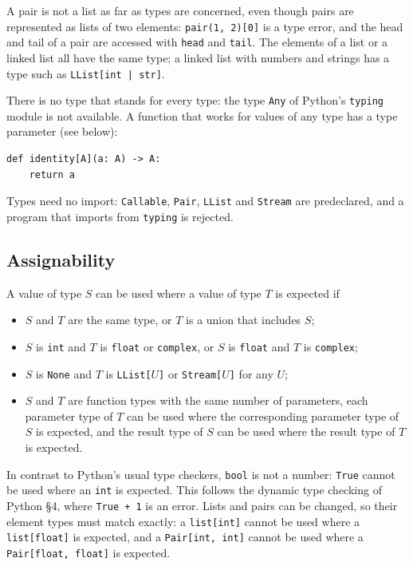 A pair is not a list as far as types are concerned, even though pairs are represented
as lists of two elements: \texttt{pair(1,~2)[0]} is a type error, and the head and tail of a
pair are accessed with \texttt{head} and \texttt{tail}. The elements of a list or a linked
list all have the same type; a linked list with numbers and strings has a type such as
\texttt{LList[int~|~str]}.

There is no type that stands for every type: the type \texttt{Any} of Python's \texttt{typing} module
is not available. A function that works for values of any type has a type parameter (see below):
\begin{lstlisting}
def identity[A](a: A) -> A:
    return a
\end{lstlisting}
Types need no import: \texttt{Callable}, \texttt{Pair}, \texttt{LList} and \texttt{Stream} are
predeclared, and a program that imports from \texttt{typing} is rejected.

\subsection*{Assignability}

A value of type $S$ can be used where a value of type $T$ is expected if
\begin{itemize}
  \item $S$ and $T$ are the same type, or $T$ is a union that includes $S$;
  \item $S$ is \texttt{int} and $T$ is \texttt{float} or \texttt{complex}, or $S$ is
    \texttt{float} and $T$ is \texttt{complex};
  \item $S$ is \texttt{None} and $T$ is \texttt{LList[}$U$\texttt{]} or \texttt{Stream[}$U$\texttt{]}
    for any $U$;
  \item $S$ and $T$ are function types with the same number of parameters, each
    parameter type of $T$ can be used where the corresponding parameter type of $S$ is
    expected, and the result type of $S$ can be used where the result type of $T$ is
    expected.
\end{itemize}
In contrast to Python's usual type checkers, \texttt{bool} is not a number: \texttt{True} cannot
be used where an \texttt{int} is expected. This follows the dynamic type checking of Python
\S 4, where \texttt{True~+~1} is an error.
Lists and pairs can be changed, so their element types must match exactly: a
\texttt{list[int]} cannot be used where a \texttt{list[float]} is expected, and a
\texttt{Pair[int,~int]} cannot be used where a \texttt{Pair[float,~float]} is expected.


